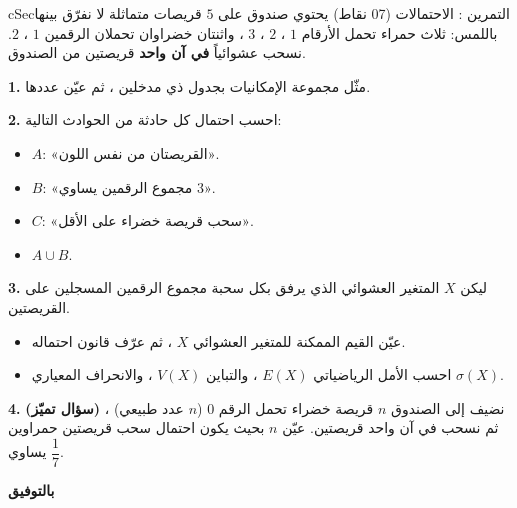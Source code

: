 \documentclass[12pt,a4paper]{article}
\newenvironment{BOX}[2]{\begin{otherlanguage}{english}\begin{arbox}{#1}{#2}}{\end{arbox}\end{otherlanguage}}
\newcounter{exo}
\newenvironment{tamrin}[1]{\stepcounter{exo}\begin{BOX}{cSec}{التمرين \theexo: #1}}{\end{BOX}}
\newenvironment{sq}{\begin{itemize}[leftmargin=2.4em,itemsep=3pt]}{\end{itemize}}
\newcommand{\qa}{\item[(أ)]}\newcommand{\qb}{\item[(ب)]}\newcommand{\qc}{\item[(جـ)]}\newcommand{\qd}{\item[(د)]}\newcommand{\qe}{\item[(هـ)]}
\newcommand{\QQ}[1]{\par\smallskip\textbf{#1.} }
\begin{document}
\begin{tamrin}{الاحتمالات (07 نقاط)}
يحتوي صندوق على $5$ قريصات متماثلة لا نفرّق بينها باللمس: ثلاث حمراء تحمل الأرقام $1$ ، $2$ ، $3$ ، واثنتان خضراوان تحملان الرقمين $1$ ، $2$. نسحب عشوائياً \textbf{في آن واحد} قريصتين من الصندوق.
\QQ{1} مثّل مجموعة الإمكانيات بجدول ذي مدخلين ، ثم عيّن عددها.
\QQ{2} احسب احتمال كل حادثة من الحوادث التالية:
\begin{sq}
\qa $A$: «القريصتان من نفس اللون».
\qb $B$: «مجموع الرقمين يساوي $3$».
\qc $C$: «سحب قريصة خضراء على الأقل».
\qd $A\cup B$.
\end{sq}
\QQ{3} ليكن $X$ المتغير العشوائي الذي يرفق بكل سحبة مجموع الرقمين المسجلين على القريصتين.
\begin{sq}
\qa عيّن القيم الممكنة للمتغير العشوائي $X$ ، ثم عرّف قانون احتماله.
\qb احسب الأمل الرياضياتي $E(X)$ ، والتباين $V(X)$ ، والانحراف المعياري $\sigma(X)$.
\end{sq}
\QQ{4} \textbf{(سؤال تميّز)} نضيف إلى الصندوق $n$ قريصة خضراء تحمل الرقم $0$ ($n$ عدد طبيعي) ، ثم نسحب في آن واحد قريصتين. عيّن $n$ بحيث يكون احتمال سحب قريصتين حمراوين يساوي $\dfrac17$.
\end{tamrin}
\begin{center}\textbf{\color{cSec}بالتوفيق}\end{center}
\end{document}
